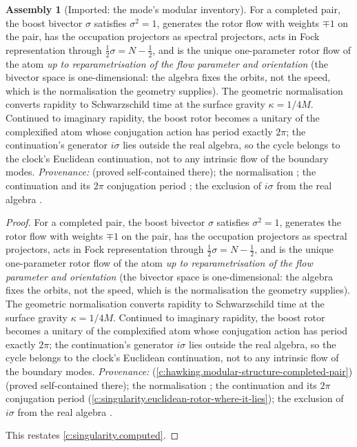 \documentclass[11pt]{article}
\theoremstyle{definition}
\newtheorem{assembled}[theorem]{Assembly}
\theoremstyle{plain}
\newcommand{\changedmark}[2]{\marginpar{\raggedright\scriptsize\color{#1}#2}}
\begin{document}
\begin{assembled}[Imported: the mode's modular inventory]\label{c:scrambling.imported-modes-modular-inventory}
\changedmark{gray}{reworded}
For a completed pair, the boost bivector $\sigma$ satisfies $\sigma^2 = 1$, generates the rotor flow with weights $\mp 1$ on the pair, has the occupation projectors as spectral projectors, acts in Fock representation through $\tfrac12\sigma = N - \tfrac12$, and is the unique one-parameter rotor flow of the atom \emph{up to reparametrisation of the flow parameter and orientation} (the bivector space is one-dimensional: the algebra fixes the orbits, not the speed, which is the normalisation the geometry supplies). The geometric normalisation converts rapidity to Schwarzschild time at the surface gravity $\kappa = 1/4M$. Continued to imaginary rapidity, the boost rotor becomes a unitary of the complexified atom whose conjugation action has period exactly $2\pi$; the continuation's generator $i\sigma$ lies outside the real algebra, so the cycle belongs to the clock's Euclidean continuation, not to any intrinsic flow of the boundary modes. \emph{Provenance:} \cite[Prop.~2.1]{ButlerT7} (proved self-contained there); the normalisation \cite[App.~A]{ButlerT5}; the continuation and its $2\pi$ conjugation period \cite[Prop.~7.21(1)]{ButlerT5}; the exclusion of $i\sigma$ from the real algebra \cite[Prop.~7.21(3)]{ButlerT5}.
\end{assembled}
\begin{proof}
For a completed pair, the boost bivector $\sigma$ satisfies $\sigma^2 = 1$, generates the rotor flow with weights $\mp 1$ on the pair, has the occupation projectors as spectral projectors, acts in Fock representation through $\tfrac12\sigma = N - \tfrac12$, and is the unique one-parameter rotor flow of the atom \emph{up to reparametrisation of the flow parameter and orientation} (the bivector space is one-dimensional: the algebra fixes the orbits, not the speed, which is the normalisation the geometry supplies). The geometric normalisation converts rapidity to Schwarzschild time at the surface gravity $\kappa = 1/4M$. Continued to imaginary rapidity, the boost rotor becomes a unitary of the complexified atom whose conjugation action has period exactly $2\pi$; the continuation's generator $i\sigma$ lies outside the real algebra, so the cycle belongs to the clock's Euclidean continuation, not to any intrinsic flow of the boundary modes. \emph{Provenance:} \cite[Prop.~2.1]{ButlerT7} (\ref{c:hawking.modular-structure-completed-pair}) (proved self-contained there); the normalisation \cite[App.~A]{ButlerT5}; the continuation and its $2\pi$ conjugation period \cite[Prop.~7.21(1)]{ButlerT5} (\ref{c:singularity.euclidean-rotor-where-it-lies}); the exclusion of $i\sigma$ from the real algebra \cite[Prop.~7.21(3)]{ButlerT5}.

This restates \ref{c:singularity.computed}.

\end{proof}
\end{document}

